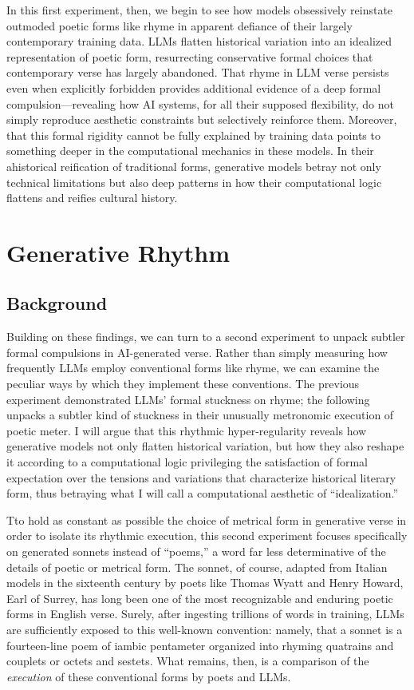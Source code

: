 \documentclass{simple-humanities}         %
\begin{document}
In this first experiment, then, we begin to see how models obsessively reinstate outmoded poetic forms like rhyme in apparent defiance of their largely contemporary training data.
LLMs flatten historical variation into an idealized representation of poetic form, resurrecting conservative formal choices that contemporary verse has largely abandoned.
That rhyme in LLM verse persists even when explicitly forbidden provides additional evidence of a deep formal compulsion---revealing how AI systems, for all their supposed flexibility, do not simply reproduce aesthetic constraints but selectively reinforce them.
Moreover, that this formal rigidity cannot be fully explained by training data points to something deeper in the computational mechanics in these models.
In their ahistorical reification of traditional forms, generative models betray not only technical limitations but also deep patterns in how their computational logic flattens and reifies cultural history.

\section{Generative Rhythm}

\subsection{Background}

Building on these findings, we can turn to a second experiment to unpack subtler formal compulsions in AI-generated verse.
Rather than simply measuring how frequently LLMs employ conventional forms like rhyme, we can examine the peculiar ways by which they implement these conventions.
The previous experiment demonstrated LLMs' formal stuckness on rhyme; the following unpacks a subtler kind of stuckness in their unusually metronomic execution of poetic meter.
I will argue that this rhythmic hyper-regularity reveals how generative models not only flatten historical variation, but how they also reshape it according to a computational logic privileging the satisfaction of formal expectation over the tensions and variations that characterize historical literary form, thus betraying what I will call a computational aesthetic of ``idealization.''

Tto hold as constant as possible the choice of metrical form in generative verse in order to isolate its rhythmic execution, this second experiment focuses specifically on generated sonnets instead of ``poems,'' a word far less determinative of the details of poetic or metrical form.
The sonnet, of course, adapted from Italian models in the sixteenth century by poets like Thomas Wyatt and Henry Howard, Earl of Surrey, has long been one of the most recognizable and enduring poetic forms in English verse. 
Surely, after ingesting trillions of words in training, LLMs are sufficiently exposed to this well-known convention: namely, that a sonnet is a fourteen-line poem of iambic pentameter organized into rhyming quatrains and couplets or octets and sestets.
What remains, then, is a comparison of the \emph{execution} of these conventional forms by poets and LLMs.
\end{document}
